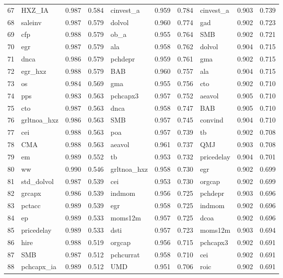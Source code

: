 \documentclass[12pt]{article}
\begin{document}
\begin{landscape}
\begin{footnotesize}
\begin{longtable}{l|lcc|lcc|lcc}
  67 & HXZ\_IA & 0.987 & 0.584 & cinvest\_a & 0.959 & 0.784 & cinvest\_a & 0.903 & 0.739 \\ 
  68 & saleinv & 0.987 & 0.579 & dolvol & 0.960 & 0.774 & gad & 0.902 & 0.723 \\ 
  69 & cfp & 0.988 & 0.579 & ob\_a & 0.955 & 0.764 & SMB & 0.902 & 0.721 \\ 
  70 & egr & 0.987 & 0.579 & ala & 0.958 & 0.762 & dolvol & 0.904 & 0.715 \\ 
  71 & dnca & 0.986 & 0.579 & pchdepr & 0.959 & 0.761 & gma & 0.902 & 0.715 \\ 
  72 & egr\_hxz & 0.988 & 0.579 & BAB & 0.960 & 0.757 & ala & 0.904 & 0.715 \\ 
  73 & os & 0.984 & 0.569 & gma & 0.955 & 0.756 & cto & 0.902 & 0.710 \\ 
  74 & pps & 0.983 & 0.563 & pchcapx3 & 0.957 & 0.752 & aeavol & 0.905 & 0.710 \\ 
  75 & cto & 0.987 & 0.563 & dnca & 0.958 & 0.747 & BAB & 0.905 & 0.710 \\ 
  76 & grltnoa\_hxz & 0.986 & 0.563 & SMB & 0.957 & 0.745 & convind & 0.904 & 0.710 \\ 
  77 & cei & 0.988 & 0.563 & poa & 0.957 & 0.739 & tb & 0.902 & 0.708 \\ 
  78 & CMA & 0.988 & 0.563 & aeavol & 0.961 & 0.737 & QMJ & 0.903 & 0.708 \\ 
  79 & em & 0.989 & 0.552 & tb & 0.953 & 0.732 & pricedelay & 0.904 & 0.701 \\ 
  80 & ww & 0.990 & 0.546 & grltnoa\_hxz & 0.958 & 0.730 & egr & 0.902 & 0.699 \\ 
  81 & std\_dolvol & 0.987 & 0.539 & cei & 0.953 & 0.730 & orgcap & 0.902 & 0.699 \\ 
  82 & grcapx & 0.986 & 0.539 & indmom & 0.956 & 0.725 & pchdepr & 0.903 & 0.696 \\ 
  83 & pctacc & 0.989 & 0.539 & egr & 0.958 & 0.725 & indmom & 0.902 & 0.696 \\ 
  84 & ep & 0.989 & 0.533 & moms12m & 0.957 & 0.725 & dcoa & 0.902 & 0.696 \\ 
  85 & pricedelay & 0.989 & 0.533 & dsti & 0.957 & 0.723 & moms12m & 0.903 & 0.694 \\ 
  86 & hire & 0.988 & 0.519 & orgcap & 0.956 & 0.715 & pchcapx3 & 0.902 & 0.691 \\ 
  87 & SMB & 0.987 & 0.512 & pchcurrat & 0.958 & 0.710 & cei & 0.902 & 0.691 \\ 
  88 & pchcapx\_ia & 0.989 & 0.512 & UMD & 0.951 & 0.706 & roic & 0.902 & 0.691 \\ 

\end{longtable}
\end{footnotesize}
\end{landscape}
\end{document}
